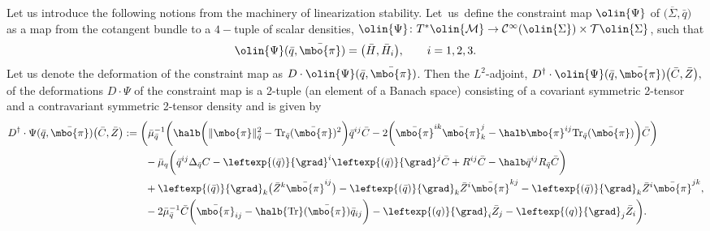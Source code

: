 Let us introduce the following notions from the machinery of linearization stability.
Let~us~define the constraint map $\olin{\Psi}$ of $\bigl(\overline{\Sigma}, \bar{q}\bigr)$ as a map from the cotangent bundle to a $4-$tuple of scalar densities, $ \olin{\Psi} \colon T^* \olin{\mathcal{M}} \to \mathcal{C}^{\infty} (\olin{\Sigma}) \times \mathcal{T} \olin{\Sigma}$, such that
\begin{align*}
\olin{\Psi} (\bar{q}, \bar{\mbo{\pi}}) = \bigl(\bar{H}, \bar{H}_i\bigr), \qquad i = 1, 2, 3.
\end{align*}
Let us denote the deformation of the constraint map as $D \cdot \olin{\Psi} (\bar{q}, \bar{\mbo{\pi}})$.
Then the $L^2$-adjoint,
$D^\dagger \cdot \olin{\Psi} (\bar{q}, \bar{\mbo{\pi}}) \bigl(\bar{C}, \bar{Z}\bigr), $ of the deformations $D \cdot \Psi$ of the constraint map is a
2-tuple (an element of a Banach space) consisting of a covariant symmetric 2-tensor and a contravariant symmetric 2-tensor density and is given by
\begin{align}
D^\dagger \cdot \Psi (\bar{q}, \bar{\mbo{\pi}}) \bigl(\bar{C}, \bar{Z}\bigr) &:= \biggl(\bar{\mu}^{-1}_{\bar{q}} \biggl( \halb \biggl(\Vert \mbo{\pi} \Vert_{\bar{q}}^2 - {\rm Tr}_{\bar{q}}(\bar{\mbo{\pi}})^2 \biggr) \bar{q}^{ij} \bar{C} - 2 \biggl(\bar{\mbo{\pi}}^{ik} \bar{\mbo{\pi}}_k^{j} - \halb \mbo{\pi}^{ij} {\rm Tr}_{\bar{q}} (\bar{\mbo{\pi}}) \biggr) \bar{C} \biggr) \notag\\
&\hphantom{:= \biggl(}{} -\bar{\mu}_q \biggl(\bar{q}^{ij} \Delta_{\bar{q}} C - \leftexp{(\bar{q})}{\grad}^{i} \leftexp{(\bar{q})}{\grad}^{j} \bar{C} + R^{ij} \bar{C} - \halb \bar{q}^{ij} R_{\bar{q}} \bar{C} \biggr) \notag\\
&\hphantom{:= \biggl(}{} + \leftexp{(\bar{q})}{\grad}_k \bigl(\bar{Z}^k \bar{\mbo{\pi}}^{ij}\bigr) - \leftexp{(\bar{q})}{\grad}_k \bar{Z}^i \bar{\mbo{\pi}}^{kj} - \leftexp{(\bar{q})}{\grad}_k \bar{Z}^i \bar{\mbo{\pi}}^{jk}, \notag\\
&\hphantom{:= \biggl(}{} -2 \bar{\mu}_{\bar{q}}^{-1} \bar{C} \biggl(\bar{\mbo{\pi}}_{ij} - \halb {\rm Tr} (\bar{\mbo{\pi}}) \bar{q}_{ij} \biggr) - \leftexp{(q)}{\grad}_i \bar{Z}_j - \leftexp{(q)}{\grad}_j \bar{Z}_i \biggr).\label{3+1adjoint}
\end{align}
\iffalse
